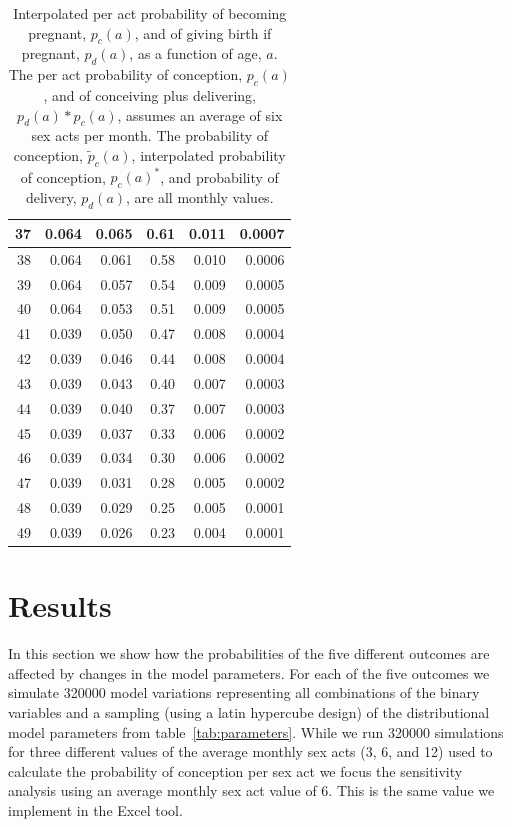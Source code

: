 \documentclass[11pt]{nih_mod}
\begin{document}
\begin{table}
\begin{center}
{\begin{tabular}{|r|r|r|r|r|r|}
\hline
        37 &       0.064 & 0.065 & 0.61 & 0.011 & 0.0007\\
\hline
        38 &       0.064 & 0.061 & 0.58 & 0.010 & 0.0006\\
\hline
        39 &      0.064 &  0.057 & 0.54 & 0.009 & 0.0005\\
\hline
        40 &      0.064 & 0.053 & 0.51 & 0.009 & 0.0005\\
\hline
        41 &       0.039 & 0.050 & 0.47 & 0.008 & 0.0004\\
\hline
        42 &       0.039 & 0.046 & 0.44 & 0.008 & 0.0004\\
\hline
        43 &       0.039 & 0.043 & 0.40 & 0.007 & 0.0003\\
\hline
        44 &       0.039 & 0.040 & 0.37 & 0.007 &0.0003\\
\hline
        45 &       0.039 & 0.037 & 0.33 & 0.006 &0.0002\\
\hline
        46 &       0.039 & 0.034 & 0.30 & 0.006 & 0.0002\\
\hline
        47 &       0.039 & 0.031 & 0.28 & 0.005 & 0.0002\\
\hline
        48 &       0.039 & 0.029 & 0.25 & 0.005 & 0.0001\\
\hline
        49 &       0.039 & 0.026 & 0.23 & 0.004 & 0.0001\\
\hline
\end{tabular} }
	\caption{Interpolated per act probability of becoming pregnant, $p_c(a)$, and of giving birth if pregnant, $p_d(a)$, as a function of age, $a$.  The per act probability of conception, $p_c(a)$, and of conceiving plus delivering, $p_d(a) * p_c(a)$,  assumes an average of six sex acts per month.  The probability of conception, $\tilde{p}_ c(a)$, interpolated probability of conception,  $p_c(a)^*$, and probability of delivery, $p_d(a)$, are all monthly values.        \label{tab:pregnancy}}
\end{center}
\end{table} 

\section{Results}
\label{sec:results}
In this section we show how the probabilities of the five different outcomes are affected by changes in the model parameters.  For each of the five outcomes we simulate 320000 model variations representing all combinations of the binary variables and a sampling (using a latin hypercube design) of the distributional model parameters from table~\ref{tab:parameters}.  While we run 320000 simulations for three different values of the average monthly sex acts (3, 6, and 12) used to calculate the probability of conception per sex act we focus the sensitivity analysis using an average monthly sex act value of 6.  This is the same value we implement in the Excel tool.  
\end{document}
